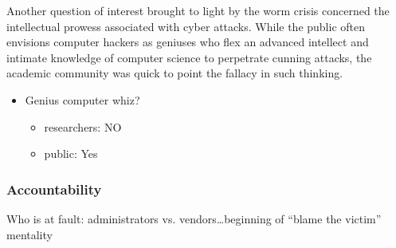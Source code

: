 Another question of interest brought to light by the worm crisis concerned the
intellectual prowess associated with cyber attacks. While the public often
envisions computer hackers as geniuses who flex an advanced intellect and
intimate knowledge of computer science to perpetrate cunning attacks, the
academic community was quick to point the fallacy in such thinking.

            	\begin{itemize}
            	\item Genius computer whiz?
            	\begin{itemize}
            		\item researchers: NO	
            		\item public: Yes	
            	\end{itemize}
       			\end{itemize}


\subsubsection*{Accountability}
Who is at fault: administrators vs. vendors\ldots beginning of
``blame the victim'' mentality

